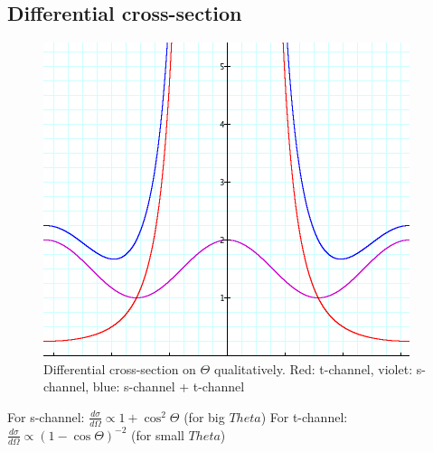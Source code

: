 \documentclass[]{article}
\begin{document}
\subsection{Differential cross-section}
\begin{figure}[H]
	\centering
	\includegraphics[scale=0.4]{differential-cross-section}
	\caption{Differential cross-section on $\Theta$ qualitatively. Red: t-channel, violet: s-channel, blue: s-channel + t-channel}
	\label{fig:diff-cross-section}
\end{figure}
For s-channel: $\frac{d\sigma}{d\Omega} \propto 1 + \cos^2{\Theta}$ (for big $Theta$)
\newline
For t-channel: $\frac{d\sigma}{d\Omega} \propto (1 - \cos{\Theta})^{-2}$ (for small $Theta$)
\end{document}
